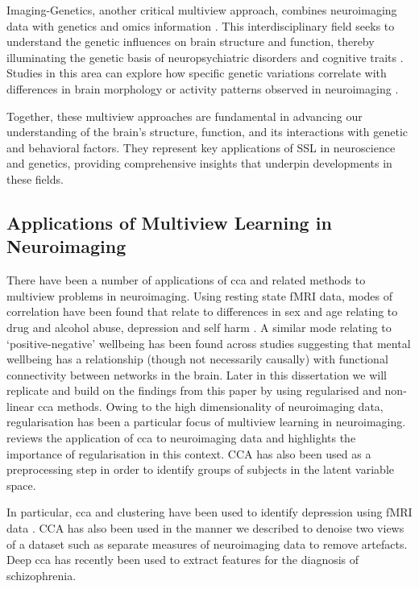 Imaging-Genetics, another critical multiview approach, combines neuroimaging data with genetics and omics information \citep{le2008sparse}.
This interdisciplinary field seeks to understand the genetic influences on brain structure and function, thereby illuminating the genetic basis of neuropsychiatric disorders and cognitive traits \citep{bogdan2017imaging}.
Studies in this area can explore how specific genetic variations correlate with differences in brain morphology or activity patterns observed in neuroimaging \citep{liu2014review}.

Together, these multiview approaches are fundamental in advancing our understanding of the brain's structure, function, and its interactions with genetic and behavioral factors.
They represent key applications of SSL in neuroscience and genetics, providing comprehensive insights that underpin developments in these fields.

\subsection{Applications of Multiview Learning in Neuroimaging}

There have been a number of applications of \acrshort{cca} and related methods to multiview problems in neuroimaging.
Using resting state fMRI data, modes of correlation have been found that relate to differences in sex and age relating to drug and alcohol abuse, depression and self harm \citep{mihalik2019brain}.
A similar mode relating to `positive-negative' wellbeing has been found across studies \citep{smith2015positive} suggesting that mental wellbeing has a relationship (though not necessarily causally) with functional connectivity between networks in the brain.
Later in this dissertation we will replicate and build on the findings from this paper by using regularised and non-linear \acrshort{cca} methods.
Owing to the high dimensionality of neuroimaging data, regularisation has been a particular focus of multiview learning in neuroimaging. \citet{mihalik2022canonical} reviews the application of \acrshort{cca} to neuroimaging data and highlights the importance of regularisation in this context. \citet{bilenko2016pyrcca} 
CCA has also been used as a preprocessing step in order to identify groups of subjects in the latent variable space.

In particular, \acrshort{cca} and clustering have been used to identify depression using fMRI data \citep{dinga2019evaluating,drysdale2017resting}.
CCA has also been used in the manner we described to denoise two \gls{views} of a dataset such as separate measures of neuroimaging data \citep{zhuang2020technical} to remove artefacts.
Deep \acrshort{cca} has recently been used to extract features for the diagnosis of schizophrenia\citep{qi2016deep}.

